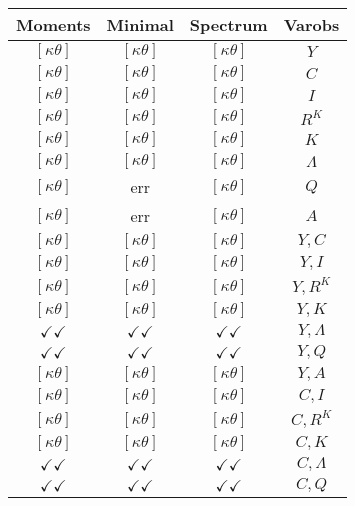 \documentclass[a4paper,10pt]{article}
\begin{document}
\centering
\begin{longtable}{|c|c|c|c|}
\hline
Moments & Minimal & Spectrum & Varobs \\
\hline
$[\kappa \theta ]$ & $[\kappa \theta ]$ & $[\kappa \theta ]$ & ${Y}$ \\
\hline
$[\kappa \theta ]$ & $[\kappa \theta ]$ & $[\kappa \theta ]$ & ${C}$ \\
\hline
$[\kappa \theta ]$ & $[\kappa \theta ]$ & $[\kappa \theta ]$ & ${I}$ \\
\hline
$[\kappa \theta ]$ & $[\kappa \theta ]$ & $[\kappa \theta ]$ & ${R^{K}}$ \\
\hline
$[\kappa \theta ]$ & $[\kappa \theta ]$ & $[\kappa \theta ]$ & ${K}$ \\
\hline
$[\kappa \theta ]$ & $[\kappa \theta ]$ & $[\kappa \theta ]$ & ${\Lambda}$ \\
\hline
$[\kappa \theta ]$ & err & $[\kappa \theta ]$ & ${Q}$ \\
\hline
$[\kappa \theta ]$ & err & $[\kappa \theta ]$ & ${A}$ \\
\hline
$[\kappa \theta ]$ & $[\kappa \theta ]$ & $[\kappa \theta ]$ & ${Y},{C}$ \\
\hline
$[\kappa \theta ]$ & $[\kappa \theta ]$ & $[\kappa \theta ]$ & ${Y},{I}$ \\
\hline
$[\kappa \theta ]$ & $[\kappa \theta ]$ & $[\kappa \theta ]$ & ${Y},{R^{K}}$ \\
\hline
$[\kappa \theta ]$ & $[\kappa \theta ]$ & $[\kappa \theta ]$ & ${Y},{K}$ \\
\hline
$\checkmark\checkmark$ & $\checkmark\checkmark$ & $\checkmark\checkmark$ & ${Y},{\Lambda}$ \\
\hline
$\checkmark\checkmark$ & $\checkmark\checkmark$ & $\checkmark\checkmark$ & ${Y},{Q}$ \\
\hline
$[\kappa \theta ]$ & $[\kappa \theta ]$ & $[\kappa \theta ]$ & ${Y},{A}$ \\
\hline
$[\kappa \theta ]$ & $[\kappa \theta ]$ & $[\kappa \theta ]$ & ${C},{I}$ \\
\hline
$[\kappa \theta ]$ & $[\kappa \theta ]$ & $[\kappa \theta ]$ & ${C},{R^{K}}$ \\
\hline
$[\kappa \theta ]$ & $[\kappa \theta ]$ & $[\kappa \theta ]$ & ${C},{K}$ \\
\hline
$\checkmark\checkmark$ & $\checkmark\checkmark$ & $\checkmark\checkmark$ & ${C},{\Lambda}$ \\
\hline
$\checkmark\checkmark$ & $\checkmark\checkmark$ & $\checkmark\checkmark$ & ${C},{Q}$ \\

\end{longtable}
\end{document}

